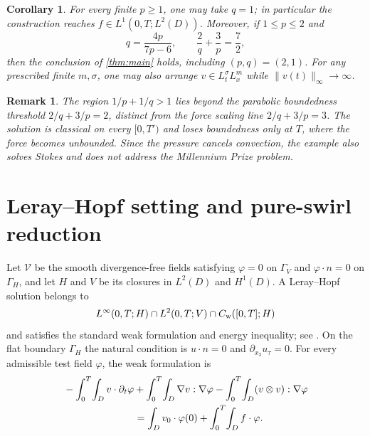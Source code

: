 \documentclass[10pt]{amsart}
\newtheorem{corollary}[theorem]{Corollary}
\newtheorem{remark}[theorem]{Remark}
\theoremstyle{definition}
\newcommand{\Gv}{\Gamma_{\!V}}
\newcommand{\Gh}{\Gamma_{\!H}}
\begin{document}
\begin{corollary}
\label{cor:curve}
For every finite $p\ge1$, one may take $q=1$; in particular the construction
reaches $f\in L^1(0,T;L^2(D))$.  Moreover, if $1\le p\le2$ and
\[
    q=\frac{4p}{7p-6},\qquad \frac2q+\frac3p=\frac72,
\]
then the conclusion of \cref{thm:main} holds, including $(p,q)=(2,1)$.
For any prescribed finite $m,\sigma$, one may also arrange
$v\in L^\sigma_tL^m_x$ while $\|v(t)\|_\infty\to\infty$.
\end{corollary}

\begin{remark}
\label{rem:context}
The region $1/p+1/q>1$ lies
beyond the parabolic boundedness threshold $2/q+3/p=2$, distinct from the force
scaling line $2/q+3/p=3$.  The solution is classical on every $[0,T')$ and
loses boundedness only at $T$, where the force becomes unbounded.  Since the
pressure cancels convection, the example also solves Stokes and does not address
the Millennium Prize problem.
\end{remark}

\section{Leray--Hopf setting and pure-swirl reduction}
\label{sec:LH}
\label{sec:reduction}
Let $\mathscr V$ be the smooth divergence-free fields satisfying
$\varphi=0$ on $\Gv$ and $\varphi\cdot n=0$ on $\Gh$, and let $H$ and $V$
be its closures in $L^2(D)$ and $H^1(D)$.  A Leray--Hopf solution belongs to
\[
 L^\infty(0,T;H)\cap L^2(0,T;V)\cap C_{\rm w}([0,T];H)
\]
and satisfies the standard weak formulation and energy inequality; see
\cite{Fursikov1982,Galdi2000,Sohr2001}.  On the flat boundary $\Gh$ the
natural condition is $u\cdot n=0$ and $\partial_{x_3}u_\tau=0$.
For every admissible test field $\varphi$, the weak formulation is
\begin{align}
\label{eq:weak-form}
 &-\int_0^T\!\int_D v\cdot\partial_t\varphi
 +\int_0^T\!\int_D\nabla v:\nabla\varphi
 -\int_0^T\!\int_D(v\otimes v):\nabla\varphi\notag\\
 &\hspace{25mm}=\int_Dv_0\cdot\varphi(0)
 +\int_0^T\!\int_Df\cdot\varphi .
\end{align}
\end{document}
